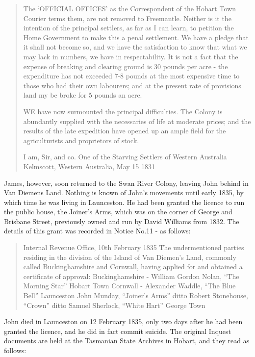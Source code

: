 \begin{quotation}
The `OFFICIAL OFFICES' as the Correspondent of the Hobart Town Courier terms them, are not removed to Freemantle. Neither is it the intention of the principal settlers, as far as I can learn, to petition the Home Government to make this a penal settlement. We have a pledge that it shall not become so, and we have the satisfaction to know that what we may lack in numbers, we have in respectability. It is not a fact that the expense of breaking and clearing ground is 30 pounds per acre - the expenditure has not exceeded 7-8 pounds at the most expensive time to those who had their own labourers; and at the present rate of provisions land my be broke for 5 pounds an acre.

WE have now surmounted the principal difficulties. The Colony is abundantly supplied with the necessaries of life at moderate prices; and the results of the late expedition have opened up an ample field for the agriculturists and proprietors of stock.

I am, Sir, and co.
One of the Starving Settlers of Western Australia
Kelmscott, Western Australia, May 15 1831
\end{quotation}

James, however, soon returned to the Swan River Colony, leaving John behind in Van Diemens Land. Nothing is known of John's movements until early 1835, by which time he was living in Launceston. He had been granted the licence to run the public house, the Joiner's Arms, which was on the corner of George and Brisbane Street, previously owned and run by David Williams from 1832. The details of this grant was recorded in Notice No.11 - as follows:

\begin{quotation}
Internal Revenue Office, 10th February 1835
The undermentioned parties residing in the division of the Island of Van Diemen's Land, commonly called Buckinghamshire and Cornwall, having applied for and obtained a certificate of approval:
Buckinghamshire -
William Gordon Nolan, ``The Morning Star'' Hobart Town
Cornwall -
Alexander Waddle, ``The Blue Bell'' Launceston
John Munday, ``Joiner's Arms'' ditto
Robert Stonehouse, ``Crown'' ditto
Samuel Sherlock, ``White Hart'' George Town
\end{quotation}

John died in Launceston on 12 February 1835, only two days after he had been granted the licence, and he did in fact commit suicide. The original Inquest documents are held at the Tasmanian State Archives in Hobart, and they read as follows:

